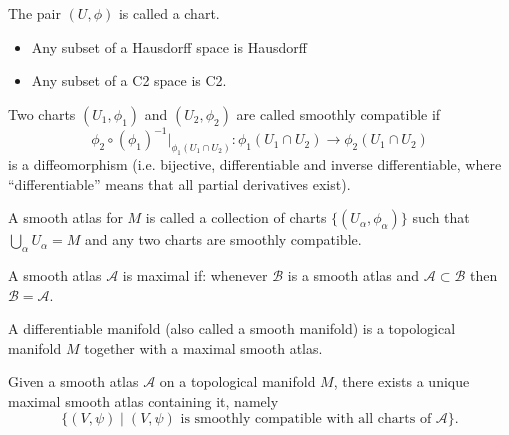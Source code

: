 \begin{definition}[Chart]
    The pair $(U, \phi)$ is called a chart.
\end{definition}

\begin{remark}\leavevmode 
    \begin{itemize}
        \item Any subset of a Hausdorff space is Hausdorff
        \item Any subset of a C2 space is C2.
    \end{itemize}
\end{remark}



\begin{definition}[Compatibility]
    Two charts $(U_1, \phi_1)$ and $(U_2, \phi_2)$ are called smoothly compatible if 
    \[
        \phi_2 \circ(\phi_1)^{-1}  |_{\phi_1(U_1 \cap  U_2)}: \phi_1(U_1 \cap  U_2) \to  \phi_2(U_1 \cap U_2)
    \] 
    is a diffeomorphism (i.e. bijective, differentiable and inverse differentiable, where ``differentiable'' means that all partial derivatives exist).
\end{definition}



\begin{definition}
    A smooth atlas for $M$ is called a collection of charts $\{(U_\alpha, \phi_\alpha)\}$ such that $\bigcup_{\alpha} U_\alpha = M$ and any two charts are smoothly compatible.
\end{definition}
\begin{definition}
    A smooth atlas $\mathcal A$ is maximal if: whenever $\mathcal B$ is a smooth atlas and $\mathcal A \subset \mathcal B$ then $\mathcal B = \mathcal A$.
\end{definition}
\begin{definition}
    A differentiable manifold (also called a smooth manifold) is a topological manifold $M$ together with a maximal smooth atlas.
\end{definition}
\begin{remark}
    Given a smooth atlas $\mathcal A$ on a topological manifold  $M$, there exists a unique maximal smooth atlas containing it, namely
    \[
        \{(V, \psi)  \mid  (V, \psi) \text{ is smoothly compatible with all charts of $\mathcal A$}\} 
    .\] 
\end{remark}

